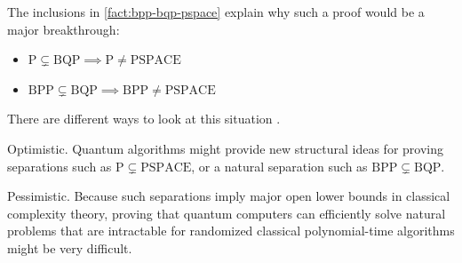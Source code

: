 The inclusions in \autoref{fact:bpp-bqp-pspace} explain why such a proof would be a major breakthrough:
\begin{itemize}
\item
\(
\mathrm{P}\subsetneq\mathrm{BQP}
\implies
\mathrm{P}
\neq
\mathrm{PSPACE}
\)
\item
\(
\mathrm{BPP}
\subsetneq
\mathrm{BQP}
\implies
\mathrm{BPP}
\neq
\mathrm{PSPACE}
\)
\end{itemize}


There are different ways to look at this situation \cite{nielsenChuangQCQI}.

\textcolor{funblue}{Optimistic}.
Quantum algorithms might provide new structural ideas for proving separations such as
\(\mathrm{P}\subsetneq\mathrm{PSPACE}\),  
or a natural separation such as 
\(\mathrm{BPP}\subsetneq\mathrm{BQP}\). 


\textcolor{funblue}{Pessimistic}.
Because such separations imply major open lower bounds in classical complexity theory, 
proving 
that quantum computers can efficiently solve natural problems that are intractable for randomized classical polynomial-time algorithms might be very difficult.

